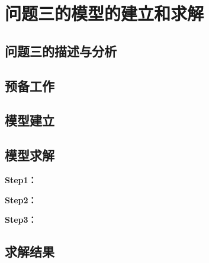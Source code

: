 \section{问题三的模型的建立和求解}
\subsection{问题三的描述与分析}

\subsection{预备工作}

\subsection{模型建立}

\subsection{模型求解}

\textbf{Step1：} 

\textbf{Step2：} 

\textbf{Step3：} 

\subsection{求解结果}